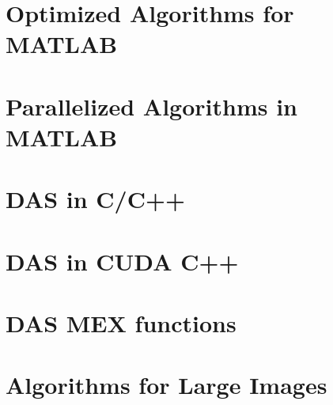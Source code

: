 \section{Optimized Algorithms for MATLAB}
\label{chapter3:optimized_matlab}

\section{Parallelized Algorithms in MATLAB}
\label{chapter3:parallel_matlab}

\section{DAS in C/C++}
\label{chapter3:compiled_DAS}

\section{DAS in CUDA C++}
\label{chapter3:CUDA_DAS}

\section{DAS MEX functions}
\label{chapter3:MEX_DAS}

\section{Algorithms for Large Images}
\label{chapter3:Large_Images}

\newpage
